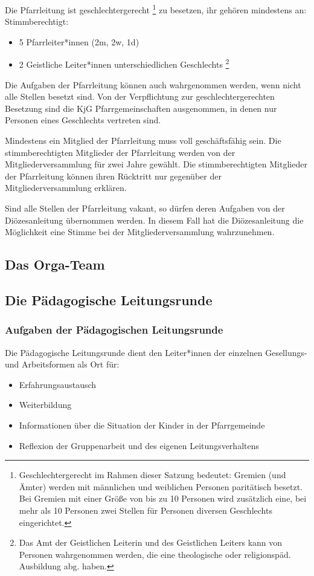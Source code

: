 \documentclass[12pt]{report}
\newcommand{\footnoteremember}[2]{
  \footnote{#2}
  \newcounter{#1}
  \setcounter{#1}{\value{footnote}}
}
\begin{document}
\begin{flushleft}
Die Pfarrleitung ist {\color{red} geschlechtergerecht}\footnoteremember{geschlechtergerecht}{\color{red}Geschlechtergerecht im Rahmen dieser Satzung bedeutet: Gremien (und Ämter) werden mit männlichen und
weiblichen Personen paritätisch besetzt. Bei Gremien mit einer Größe von bis zu 10 Personen wird zusätzlich
eine, bei mehr als 10 Personen zwei Stellen für Personen diversen Geschlechts eingerichtet.} zu besetzen, ihr gehören mindestens an:
Stimmberechtigt:
\begin{itemize}
  \item {\color{red}5 Pfarrleiter*innen (2m, 2w, 1d)}
  \item {\color{red}2 Geistliche Leiter*innen unterschiedlichen Geschlechts\footnoteremember{Berechtigung Geist}{
    Das Amt der Geistlichen Leiterin und des Geistlichen Leiters kann von Personen wahrgenommen werden,
    die eine theologische oder religionspäd. Ausbildung abg. haben.
  }}
\end{itemize}
Die Aufgaben der Pfarrleitung können auch wahrgenommen werden, wenn nicht alle Stellen besetzt sind.
{\color{red} Von der Verpflichtung zur geschlechtergerechten Besetzung sind die KjG Pfarrgemeinschaften ausgenommen, in
denen nur Personen eines Geschlechts vertreten sind.}

Mindestens ein Mitglied der Pfarrleitung muss voll geschäftsfähig sein.
Die stimmberechtigten Mitglieder der Pfarrleitung werden von der Mitgliederversammlung für
zwei Jahre gewählt. Die stimmberechtigten Mitglieder der Pfarrleitung können ihren Rücktritt nur
gegenüber der Mitgliederversammlung erklären.

Sind alle Stellen der Pfarrleitung vakant, so dürfen deren Aufgaben von der
Diözesanleitung übernommen werden. In diesem Fall hat die Diözesanleitung die Möglichkeit eine
Stimme bei der Mitgliederversammlung wahrzunehmen.

\subsection{Das Orga-Team}
\subsection{Die Pädagogische Leitungsrunde}
\subsubsection{Aufgaben der Pädagogischen Leitungsrunde}
Die Pädagogische Leitungsrunde dient den Leiter*innen der einzelnen Gesellungs- und Arbeitsformen als Ort für:
\begin{itemize}
  \item Erfahrungsaustausch
  \item Weiterbildung
  \item Informationen über die Situation der {\color{red} Kinder} in der Pfarrgemeinde
  \item Reflexion der Gruppenarbeit und des eigenen Leitungsverhaltens
\end{itemize}


\end{flushleft}
\end{document}
